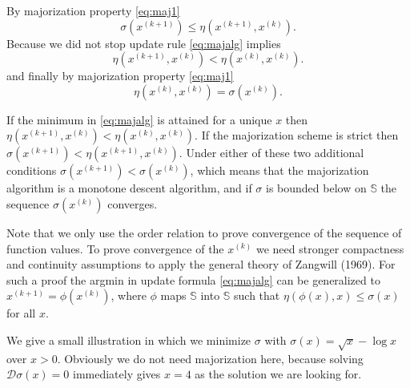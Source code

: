 \documentclass[
  12pt,
]{article}
\begin{document}
By majorization property \eqref{eq:maj1}
\begin{equation}
\sigma(x^{(k+1)})\leq\eta(x^{(k+1)},x^{(k)}).
\end{equation}
Because we did not stop update rule \eqref{eq:majalg} implies
\begin{equation}
\eta(x^{(k+1)},x^{(k)})<\eta(x^{(k)},x^{(k)}).
\end{equation}
and finally by majorization property \eqref{eq:maj1}
\begin{equation}
\eta(x^{(k)},x^{(k)})=\sigma(x^{(k)}).
\end{equation}

If the minimum in \eqref{eq:majalg} is attained for a unique \(x\) then
\(\eta(x^{(k+1)},x^{(k)})<\eta(x^{(k)},x^{(k)})\). If the majorization
scheme is strict then \(\sigma(x^{(k+1)})<\eta(x^{(k+1)},x^{(k)})\). Under
either of these two additional conditions
\(\sigma(x^{(k+1)})<\sigma(x^{(k)})\), which means that the majorization
algorithm is a monotone descent algorithm, and if \(\sigma\) is bounded
below on \(\mathbb{S}\) the sequence \(\sigma(x^{(k)})\) converges.

Note that we only use the order relation to prove convergence of the
sequence of function values. To prove convergence of the \(x^{(k)}\) we
need stronger compactness and continuity assumptions to apply the
general theory of Zangwill (1969). For such a proof the argmin in update
formula \eqref{eq:majalg} can be generalized to
\(x^{(k+1)}=\phi(x^{(k)})\), where \(\phi\) maps \(\mathbb{S}\) into
\(\mathbb{S}\) such that \(\eta(\phi(x),x)\leq\sigma(x)\) for all \(x\).

We give a small illustration in which we minimize \(\sigma\) with
\(\sigma(x)=\sqrt{x}-\log{x}\) over \(x>0\). Obviously we do not need
majorization here, because solving \(\mathcal{D}\sigma(x)=0\) immediately
gives \(x=4\) as the solution we are looking for.
\end{document}
